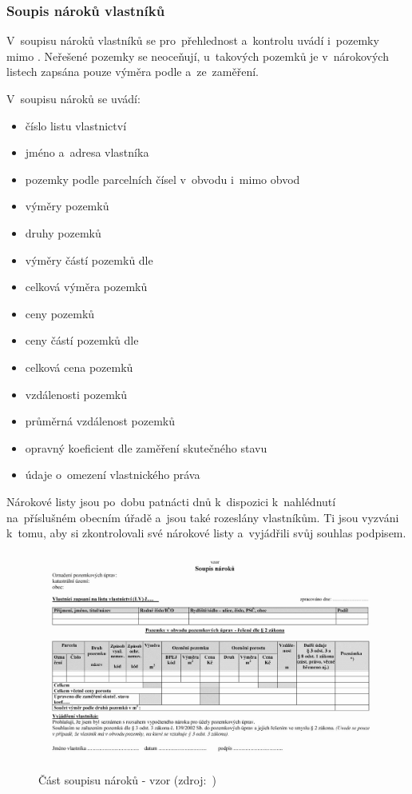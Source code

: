 \subsubsection{Soupis nároků vlastníků}
\label{soupis_naroku_vlastniku}

V~soupisu nároků vlastníků se pro~přehlednost a~kontrolu uvádí
i~pozemky mimo . Neřešené pozemky se neoceňují, u~takových
pozemků je v~nárokových listech zapsána pouze výměra podle 
a~ze~zaměření.

V~soupisu nároků se uvádí: \vspace{-\topsep}
	\begin{itemize}[leftmargin=1.5cm, noitemsep]
		\item číslo listu vlastnictví
		\item jméno a~adresa vlastníka
		\item pozemky podle parcelních čísel v~obvodu i~mimo
obvod 
		\item výměry pozemků
		\item druhy pozemků
		\item výměry částí pozemků dle 
		\item celková výměra pozemků
		\item ceny pozemků
		\item ceny částí pozemků dle 
		\item celková cena pozemků
		\item vzdálenosti pozemků
		\item průměrná vzdálenost pozemků
		\item opravný koeficient dle zaměření skutečného stavu
		\item údaje o~omezení vlastnického práva
	\end{itemize}

Nárokové listy jsou po~dobu patnácti dnů k~dispozici k~nahlédnutí
na~příslušném obecním úřadě a~jsou také rozeslány vlastníkům. Ti jsou
vyzváni k~tomu, aby si zkontrolovali své nárokové listy a~vyjádřili
svůj souhlas podpisem.
 	
	\begin{figure}[H] \centering
		\includegraphics[width=.9\textwidth]{./pictures/soupis_naroku.png}
		\caption[Část soupisu nároků - vzor]{Část soupisu nároků - vzor
(zdroj:~\citep{vyhlaska_13})}
		\label{fig:soupis_naroku}
 	\end{figure}

